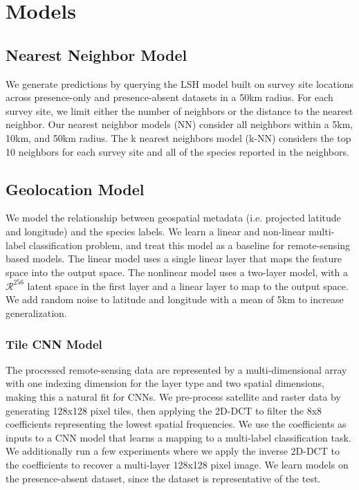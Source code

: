 \section{Models}

\subsection{Nearest Neighbor Model}

We generate predictions by querying the LSH model built on survey site locations across presence-only and presence-absent datasets in a 50km radius.
For each survey site, we limit either the number of neighbors or the distance to the nearest neighbor.
Our nearest neighbor models (NN) consider all neighbors within a 5km, 10km, and 50km radius.
The k nearest neighbors model (k-NN) considers the top 10 neighbors for each survey site and all of the species reported in the neighbors.

\subsection{Geolocation Model}

We model the relationship between geospatial metadata (i.e. projected latitude and longitude) and the species labels.
We learn a linear and non-linear multi-label classification problem, and treat this model as a baseline for remote-sensing based models.
The linear model uses a single linear layer that maps the feature space into the output space.
The nonlinear model uses a two-layer model, with a $\mathcal{R}^{256}$ latent space in the first layer and a linear layer to map to the output space.
We add random noise to latitude and longitude with a mean of 5km to increase generalization.

\subsubsection{Tile CNN Model}
\label{sec:tile-cnn}

The processed remote-sensing data are represented by a multi-dimensional array with one indexing dimension for the layer type and two spatial dimensions, making this a natural fit for CNNs.
We pre-process satellite and raster data by generating 128x128 pixel tiles, then applying the 2D-DCT to filter the 8x8 coefficients representing the lowest spatial frequencies.
We use the coefficients as inputs to a CNN model that learns a mapping to a multi-label classification task.
We additionally run a few experiments where we apply the inverse 2D-DCT to the coefficients to recover a multi-layer 128x128 pixel image.
We learn models on the presence-absent dataset, since the dataset is representative of the test.

